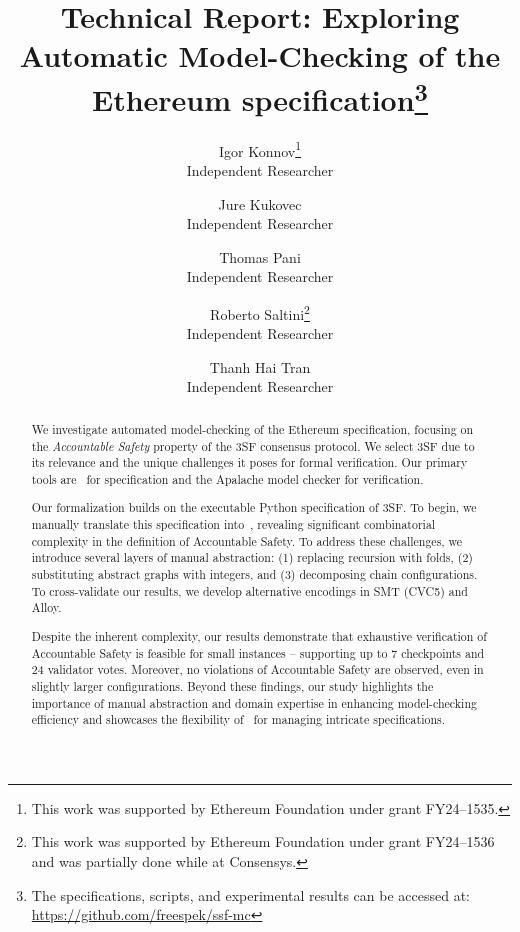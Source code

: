 \documentclass[12pt]{article}
\title{\vspace{-2em}Technical Report: Exploring Automatic Model-Checking of the Ethereum specification\footnote{%
		The specifications, scripts, and experimental results can be accessed at: \url{https://github.com/freespek/ssf-mc}}}
\author{%
    Igor Konnov\thanks{This work was supported by Ethereum Foundation
    under grant FY24--1535.}\\ \footnotesize Independent Researcher%
    \and
    Jure Kukovec\footnotemark[2] \\ \footnotesize Independent Researcher%
    \and
    Thomas Pani\footnotemark[2] \\ \footnotesize Independent Researcher%
    \and
    Roberto Saltini\thanks{This work was supported by Ethereum Foundation
    under grant FY24--1536 and was partially done while at Consensys.} \\
    \footnotesize Independent Researcher%
    \and
    Thanh Hai Tran\footnotemark[3] \\ \footnotesize Independent Researcher%
}
\date{}
\begin{document}
\maketitle

\begin{abstract}%
We investigate automated model-checking of the Ethereum specification, focusing
on the \emph{Accountable Safety} property of the 3SF consensus protocol. We
select 3SF due to its relevance and the unique challenges it poses for formal
verification. Our primary tools are~\tlap{} for specification and the Apalache
model checker for verification.

Our formalization builds on the executable Python specification of 3SF\@. To
begin, we manually translate this specification into~\tlap{}, revealing
significant combinatorial complexity in the definition of Accountable Safety.
To address these challenges, we introduce several layers of manual abstraction:
(1) replacing recursion with folds, (2) substituting abstract graphs with
integers, and (3) decomposing chain configurations.
To cross-validate our results, we develop alternative encodings in SMT (CVC5)
and Alloy.

Despite the inherent complexity, our results demonstrate that exhaustive
verification of Accountable Safety is feasible for small instances --
supporting up to 7 checkpoints and 24 validator votes. Moreover, no violations
of Accountable Safety are observed, even in slightly larger configurations.
Beyond these findings, our study highlights the importance of manual
abstraction and domain expertise in enhancing model-checking efficiency and
showcases the flexibility of~\tlap{} for managing intricate specifications.%
\end{abstract}%
\newpage%

\setcounter{tocdepth}{2}  %
\tableofcontents















\end{document}
